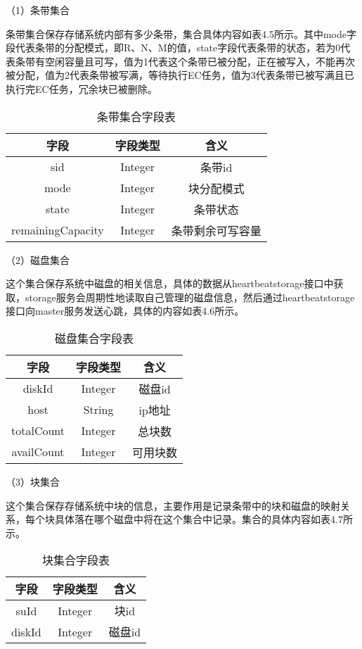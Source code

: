（1）条带集合

条带集合保存存储系统内部有多少条带，集合具体内容如表4.5所示。其中mode字段代表条带的分配模式，即R、N、M的值，state字段代表条带的状态，若为0代表条带有空闲容量且可写，值为1代表这个条带已被分配，正在被写入，不能再次被分配，值为2代表条带被写满，等待执行EC任务，值为3代表条带已被写满且已执行完EC任务，冗余块已被删除。

\begin{table}[h]
    \centering
    \caption{条带集合字段表}
    \begin{tabular}{ccc}
      \toprule
      字段   & 字段类型   & 含义                          \\
      \midrule
      sid               & Integer   & 条带id             \\
      mode              & Integer   & 块分配模式          \\
      state             & Integer   & 条带状态            \\
      remainingCapacity & Integer   & 条带剩余可写容量     \\
      \bottomrule
    \end{tabular}
\end{table}

（2）磁盘集合

这个集合保存系统中磁盘的相关信息，具体的数据从heartbeatstorage接口中获取，storage服务会周期性地读取自己管理的磁盘信息，然后通过heartbeatstorage接口向master服务发送心跳，具体的内容如表4.6所示。

\begin{table}[h]
  \centering
  \caption{磁盘集合字段表}
  \begin{tabular}{ccc}
    \toprule
    字段   & 字段类型   & 含义          \\
    \midrule
    diskId     & Integer   & 磁盘id    \\
    host       & String    & ip地址    \\
    totalCount & Integer   & 总块数    \\
    availCount & Integer   & 可用块数  \\
    \bottomrule
  \end{tabular}
\end{table}

（3）块集合

这个集合保存存储系统中块的信息，主要作用是记录条带中的块和磁盘的映射关系，每个块具体落在哪个磁盘中将在这个集合中记录。集合的具体内容如表4.7所示。

\begin{table}[h]
    \centering
    \caption{块集合字段表}
    \begin{tabular}{ccc}
      \toprule
      字段   & 字段类型   & 含义                   \\
      \midrule
      suId     & Integer   & 块id                 \\
      diskId   & Integer   & 磁盘id                \\
      \bottomrule
    \end{tabular}
\end{table}

